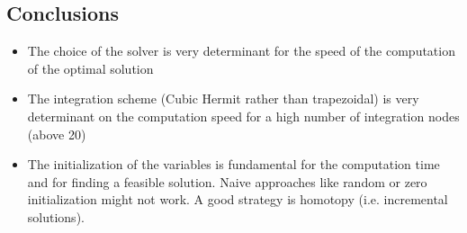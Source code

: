 \subsection*{Conclusions}
\begin{itemize}
\item The choice of the solver is very determinant for the speed of the computation of the optimal solution
\item The integration scheme (Cubic Hermit rather than trapezoidal) is very determinant on the computation speed for a high number of integration nodes (above 20)
\item The initialization of the variables is fundamental for the computation time and for finding a feasible solution. Naive approaches like random or zero initialization might not work. A good strategy is homotopy (i.e. incremental solutions).
\end{itemize}